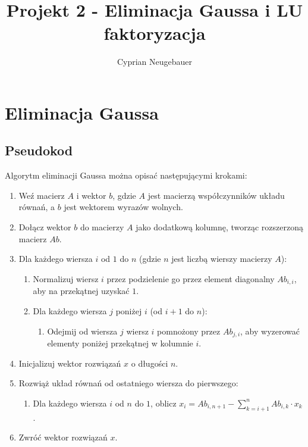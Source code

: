 \documentclass{article}
\title{Projekt 2 - Eliminacja Gaussa i LU faktoryzacja}
\author{Cyprian Neugebauer}
\date{}
\begin{document}
\maketitle

\section{Eliminacja Gaussa}

\subsection{Pseudokod}

Algorytm eliminacji Gaussa można opisać następującymi krokami:

\begin{enumerate}
    \item Weź macierz $A$ i wektor $b$, gdzie $A$ jest macierzą współczynników układu równań, a $b$ jest wektorem wyrazów wolnych.
    \item Dołącz wektor $b$ do macierzy $A$ jako dodatkową kolumnę, tworząc rozszerzoną macierz $Ab$.
    \item Dla każdego wiersza $i$ od $1$ do $n$ (gdzie $n$ jest liczbą wierszy macierzy $A$):
    \begin{enumerate}
        \item Normalizuj wiersz $i$ przez podzielenie go przez element diagonalny $Ab_{i,i}$, aby na przekątnej uzyskać $1$.
        \item Dla każdego wiersza $j$ poniżej $i$ (od $i+1$ do $n$):
        \begin{enumerate}
            \item Odejmij od wiersza $j$ wiersz $i$ pomnożony przez $Ab_{j,i}$, aby wyzerować elementy poniżej przekątnej w kolumnie $i$.
        \end{enumerate}
    \end{enumerate}
    \item Inicjalizuj wektor rozwiązań $x$ o długości $n$.
    \item Rozwiąż układ równań od ostatniego wiersza do pierwszego:
    \begin{enumerate}
        \item Dla każdego wiersza $i$ od $n$ do $1$, oblicz $x_i = Ab_{i,n+1} - \sum_{k=i+1}^{n} Ab_{i,k} \cdot x_k$.
    \end{enumerate}
    \item Zwróć wektor rozwiązań $x$.
\end{enumerate}
\end{document}
